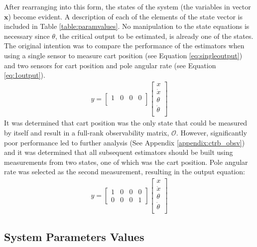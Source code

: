 \documentclass{article}
\newcommand{\matr}[1]{\bm{#1}}     %
\begin{document}
After rearranging into this form, the states of the system (the variables in vector $\matr{x}$) become evident. A description of each of the elements of the state vector is included in Table \ref{table:paramvalues}. No manipulation to the state equations is necessary since $\theta$, the critical output to be estimated, is already one of the states.\\

The original intention was to compare the performance of the estimators when using a single sensor to measure cart position (see Equation \ref{eq:singleoutput}) and two sensors for cart position and pole angular rate (see Equation \ref{eq:1output}). 
 \begin{align}
 y = \begin{bmatrix}
 1 & 0 & 0 & 0 \\
 \end{bmatrix} \begin{bmatrix}
 	x \\
 	\dot{x} \\
 	\theta \\
 	\dot{\theta} \\
 \end{bmatrix}
 \label{eq:singleoutput}
 \end{align}
 It was determined that cart position was the only state that could be measured by itself and result in a full-rank observability matrix, $\mathcal{O}$. However, significantly poor performance led to further analysis (See Appendix \ref{appendix:ctrb_obsv}) and it was determined that all subsequent estimators should be built using measurements from two states, one of which was the cart position. Pole angular rate was selected as the second measurement, resulting in the output equation:
\begin{align}
y = \begin{bmatrix}
1 & 0 & 0 & 0 \\
0 & 0 & 0 & 1
\end{bmatrix} \begin{bmatrix}
	x \\
	\dot{x} \\
	\theta \\
	\dot{\theta} \\
\end{bmatrix}
\label{eq:1output}
\end{align}

\subsection{System Parameters Values}
\end{document}
